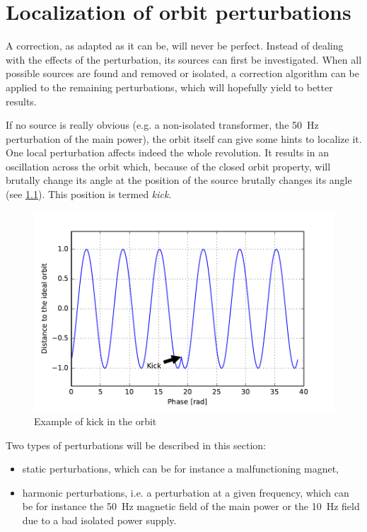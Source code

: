 
\chapter{Localization of orbit perturbations}
\label{sec:localization}

 A correction, as adapted as it can be, will never be perfect. Instead of dealing with the effects of the perturbation, its sources can first be investigated. When all possible sources are found and removed or isolated, a correction algorithm can be applied to the remaining perturbations, which will hopefully yield to better results.
 
 If no source is really obvious (e.g. a non-isolated transformer, the \SI{50}{\hertz} perturbation of the main power), the orbit itself can give some hints to localize it. One local perturbation affects indeed the whole revolution. It results in an oscillation across the orbit which, because of the closed orbit property, will brutally change its angle at the position of the source  brutally changes its angle (see \cref{fig:kick}). This position is termed \textit{kick}.

\begin{figure}[!h]
	\centering
	\includegraphics[width=.9\linewidth]{img/kick}
	\caption{\label{fig:kick}Example of kick in the orbit}
\end{figure}

Two types of perturbations will be described in this section:
\begin{itemize}
	\item static perturbations, which can be  for instance a malfunctioning magnet,
	\item harmonic perturbations, i.e. a perturbation at a given frequency, which can be for instance the \SI{50}{Hz} magnetic field of the main power or the \SI{10}{Hz} field due to a bad isolated power supply.
\end{itemize}

